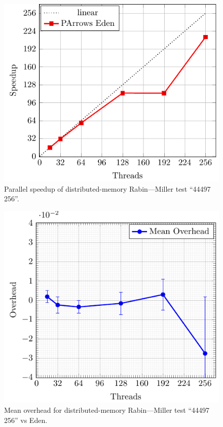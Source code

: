 \documentclass[paper=A4,twoside=true,openright,parskip=full,chapterprefix=true,headings=normal,bibliography=totoc,listof=totoc,titlepage=on,captions=tableabove,draft=false,british]{scrreprt}%
\renewcommand{\enquote}[1]{{``}#1{''}}
\begin{document}
\begin{figure}[h]
\centering
\includegraphics{src/img/perfDistRM256.pdf}
\caption{Parallel speedup of distributed-memory Rabin---Miller test
\enquote{44497 256}.\label{fig:perfDistRM256}}
\end{figure}

\vfill

\begin{figure}[h]
\centering
\includegraphics{src/img/overDistRM256Eden.pdf}
\caption{Mean overhead for distributed-memory Rabin---Miller test
\enquote{44497 256} vs Eden.\label{fig:overDistRM256Eden}}
\end{figure}
\end{document}
